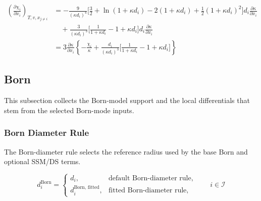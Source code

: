 \documentclass[12pt, letterpaper]{article}
\begin{document}
\begin{equation}
    \begin{aligned}
        \left(\frac{\partial\chi_{i}}{\partial x_{i}}\right)_{T,v,x_{j\neq i}}
        &=
        -\frac{9}{\left(\kappa d_{i}\right)^{4}}
        \Biggl[
            \frac{3}{2}+\ln(1+\kappa d_{i})-2(1+\kappa d_{i})
            +\frac{1}{2}\left(1+\kappa d_{i}\right)^{2}
        \Biggr]
        d_{i}\frac{\partial\kappa}{\partial x_{i}}
        \\
        &\quad +
        \frac{3}{\left(\kappa d_{i}\right)^{3}}
        \Biggl[
            \frac{1}{1+\kappa d_{i}}-1+\kappa d_{i}
        \Biggr]
        d_{i}\frac{\partial\kappa}{\partial x_{i}}
        \\
        &=
        3\frac{\partial\kappa}{\partial x_{i}}
        \left\{
            -\frac{\chi_{i}}{\kappa}
            +
            \frac{d_{i}}{\left(\kappa d_{i}\right)^{3}}
            \Biggl[
                \frac{1}{1+\kappa d_{i}}-1+\kappa d_{i}
            \Biggr]
        \right\}
    \end{aligned}
    \label{eq:dchi_dh_dxi}
\end{equation}

\subsection{Born}
\label{sec:born}

This subsection collects the Born-model support and the local differentials that stem from the selected Born-mode inputs.

\subsubsection{Born Diameter Rule}

The Born-diameter rule selects the reference radius used by the base Born and optional SSM/DS terms.

\begin{equation}
    d^{\text{Born}}_{i}
    =
    \begin{cases}
        d_{i}, & \text{default Born-diameter rule}, \\
        d^{\text{Born, fitted}}_{i}, & \text{fitted Born-diameter rule},
    \end{cases}
    \qquad i\in\mathcal{I}
    \label{eq:d_born_rule}
\end{equation}
\end{document}

